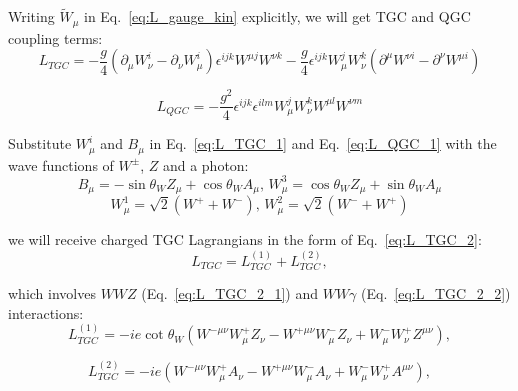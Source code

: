 Writing $\tilde{W}_\mu$ in Eq.~\ref{eq:L_gauge_kin} explicitly, we will get TGC and QGC coupling terms:\\ 

\begin{equation} \label{eq:L_TGC_1}
L_{TGC} = -\frac{g}{4}(\partial_\mu W_\nu^i - \partial_\nu W_\mu^i)\epsilon^{ijk}W^{\mu j}W^{\nu k} - \frac{g}{4}\epsilon^{ijk}W_\mu^j W_\nu^k (\partial^\mu W^{\nu i} - \partial^\nu W^{\mu i})
\end{equation}

\begin{equation} \label{eq:L_QGC_1}
L_{QGC} = -\frac{g^2}{4} \epsilon^{ijk} \epsilon^{ilm} W_\mu^j W_\nu^k W^{\mu l} W^{\nu m}
\end{equation}

Substitute $W_\mu^i$ and $B_\mu$ in Eq.~\ref{eq:L_TGC_1} and Eq.~\ref{eq:L_QGC_1} with the wave functions of $W^\pm$, $Z$ and a photon:\\

\begin{equation} \label{eq:EWK_Zg_bosons_mixing}
B_\mu = -\sin \theta_W Z_\mu + \cos \theta_W A_\mu \text{, } W_\mu^3 = \cos \theta_W Z_\mu + \sin \theta_W A_\mu
\end{equation}
\begin{equation} \label{eq:EWK_Zg_bosons_mixing}
W_\mu^1 = \sqrt{2}(W^+ + W^-) \text{, }W_\mu^2 = \sqrt{2}(W^- + W^+)
\end{equation}

we will receive charged TGC Lagrangians in the form of Eq.~\ref{eq:L_TGC_2}:\\


\begin{equation} \label{eq:L_TGC_2}
L_{TGC} = L_{TGC}^{(1)} + L_{TGC}^{(2)},
\end{equation}

which involves $WWZ$ (Eq.~\ref{eq:L_TGC_2_1}) and $WW\gamma$ (Eq.~\ref{eq:L_TGC_2_2}) interactions:\\

\begin{equation} \label{eq:L_TGC_2_1}
L_{TGC}^{(1)} = -ie \cot \theta_W (W^{-\mu\nu} W^{+}_\mu Z_\nu - W^{+\mu\nu} W^-_\mu Z_\nu +W^-_\mu W^+_\nu Z^{\mu\nu}),
\end{equation}

\begin{equation} \label{eq:L_TGC_2_2}
L_{TGC}^{(2)} = - ie(W^{-\mu\nu}W^+_\mu A_\nu - W^{+\mu\nu}W^-_\mu A_\nu + W^-_\mu W^+_\nu A^{\mu\nu}),
\end{equation}

